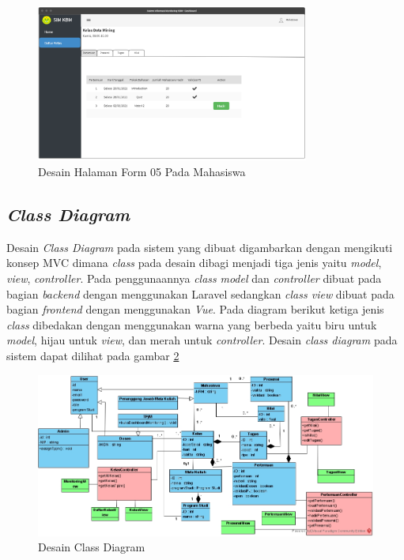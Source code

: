 \begin{figure}[h!]
	\centering
	\includegraphics[width=0.8\textwidth]{gambar/mockup/form05_mahasiswa}
	\caption{Desain Halaman Form 05 Pada Mahasiswa }
	\label{fig:form05mhs}
\end{figure}


\subsection{\textit{Class Diagram}}
	Desain \textit{Class Diagram} pada sistem yang dibuat digambarkan dengan mengikuti konsep MVC dimana \textit{class} pada desain dibagi menjadi tiga jenis yaitu \textit{model}, \textit{view}, \textit{controller}. Pada penggunaannya \textit{class} \textit{model} dan \textit{controller} dibuat pada bagian \textit{backend} dengan menggunakan Laravel sedangkan \textit{class view} dibuat pada bagian \textit{frontend} dengan menggunakan \textit{Vue}. Pada diagram berikut ketiga jenis \textit{class} dibedakan dengan menggunakan warna yang berbeda yaitu biru untuk \textit{model}, hijau untuk \textit{view}, dan merah untuk \textit{controller}. Desain \textit{class diagram} pada sistem dapat dilihat pada gambar \ref{fig:classdiagram}

\begin{figure}[H]
	\centering
	\includegraphics[width=1\textwidth]{gambar/diagram/Class Diagram Fix}
	\caption{Desain Class Diagram}
	\label{fig:classdiagram}
\end{figure}


